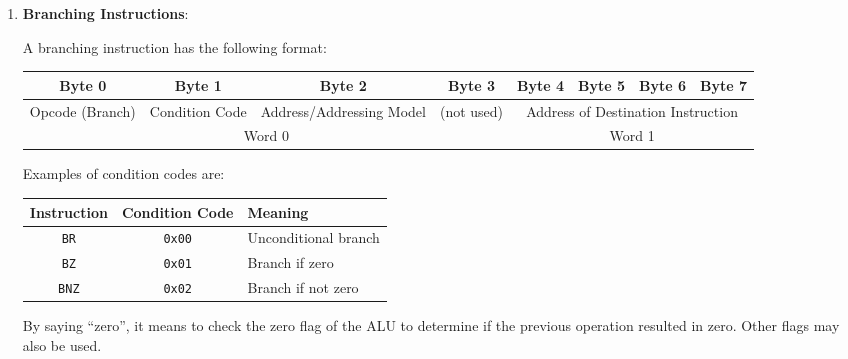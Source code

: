 \begin{enumerate}
\item \textbf{Branching Instructions}:

A branching instruction has the following format:
\begin{table}[H]
    \centering
    \begin{tabular}{ccccclll}
    Byte 0                                & Byte 1                              & Byte 2                                         & Byte 3                          & Byte 4     & Byte 5     & Byte 6     & Byte 7    \\ \hline
    \multicolumn{1}{|c|}{Opcode (Branch)} & \multicolumn{1}{c|}{Condition Code} & \multicolumn{1}{c|}{Address/Addressing Model} & \multicolumn{1}{c|}{(not used)} & \multicolumn{4}{c|}{Address of Destination Instruction} \\ \hline
    \multicolumn{4}{c}{Word 0}                                                                                                                                     & \multicolumn{4}{c}{Word 1}                      
    \end{tabular}
\end{table}

Examples of condition codes are:
\begin{table}[H]
    \centering
    \begin{tabular}{|c|c|l|}
    \hline
    \textbf{Instruction} & \textbf{Condition Code} & \textbf{Meaning} \\ \hline
    \texttt{BR} & \texttt{0x00} & Unconditional branch \\ \hline
    \texttt{BZ} & \texttt{0x01} & Branch if zero \\ \hline
    \texttt{BNZ} & \texttt{0x02} & Branch if not zero \\ \hline
    \end{tabular}
\end{table}
By saying ``zero'', it means to check the zero flag of the ALU to determine if the previous
operation resulted in zero. Other flags may also be used.


\end{enumerate}
